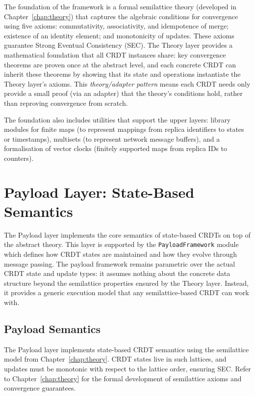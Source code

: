 The foundation of the framework is a formal semilattice theory (developed in Chapter~\ref{chap:theory}) that captures the algebraic conditions for convergence using five axioms: commutativity, associativity, and idempotence of merge; existence of an identity element; and monotonicity of updates. These axioms guarantee Strong Eventual Consistency (SEC). The Theory layer provides a mathematical foundation that all CRDT instances share: key convergence theorems are proven once at the abstract level, and each concrete CRDT can inherit these theorems by showing that its state and operations instantiate the Theory layer's axioms. This \emph{theory/adapter pattern} means each CRDT needs only provide a small proof (via an adapter) that the theory's conditions hold, rather than reproving convergence from scratch.

The foundation also includes utilities that support the upper layers: library modules for finite maps (to represent mappings from replica identifiers to states or timestamps), multisets (to represent network message buffers), and a formalisation of vector clocks (finitely supported maps from replica IDs to counters).

\section{Payload Layer: State-Based Semantics}
\label{sec:framework-payload}

The Payload layer implements the core semantics of state-based CRDTs on top of the abstract theory. This layer is supported by the \texttt{PayloadFramework} module which defines how CRDT states are maintained and how they evolve through message passing. The payload framework remains parametric over the actual CRDT state and update types: it assumes nothing about the concrete data structure beyond the semilattice properties ensured by the Theory layer. Instead, it provides a generic execution model that any semilattice-based CRDT can work with.

\subsection{Payload Semantics}

The Payload layer implements state-based CRDT semantics using the semilattice model from Chapter~\ref{chap:theory}. CRDT states live in such lattices, and updates must be monotonic with respect to the lattice order, ensuring SEC. Refer to Chapter~\ref{chap:theory} for the formal development of semilattice axioms and convergence guarantees.

